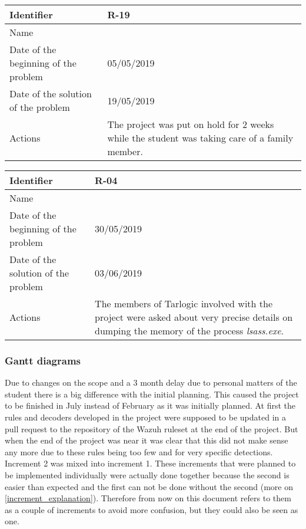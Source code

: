 \begin{table}[H]
	\begin{tabularx}{\textwidth}{|l|X|}
		\hline
		\rowcolor{gray!30}
		Identifier & \textbf{R-19} \\ \hline
		Name & \Rdiecinueve \\ \hline
		Date of the beginning of the problem & 05/05/2019 \\ \hline
		Date of the solution of the problem & 19/05/2019 \\ \hline
		Actions & The project was put on hold for 2 weeks while the student was taking care of a family member. \\ \hline
	\end{tabularx}
\end{table}
\begin{table}[H]
	\begin{tabularx}{\textwidth}{|l|X|}
		\hline
		\rowcolor{gray!30}
		Identifier & \textbf{R-04} \\ \hline
		Name & \Rcuatro \\ \hline
		Date of the beginning of the problem & 30/05/2019 \\ \hline
		Date of the solution of the problem & 03/06/2019 \\ \hline
		Actions & The members of Tarlogic involved with the project were asked about very precise details on dumping the memory of the process \textit{lsass.exe}. \\ \hline
	\end{tabularx}
\end{table}

\subsubsection{Gantt diagrams}
Due to changes on the scope and a 3 month delay due to personal matters of the student there is a big difference with the initial planning.
This caused the project to be finished in July instead of February as it was initially planned.
\linej
At first the rules and decoders developed in the project were supposed to be updated in a pull request to the repository of the Wazuh ruleset at the end of the project.
But when the end of the project was near it was clear that this did not make sense any more due to these rules being too few and for very specific detections.
\linej
\linej
Increment 2 was mixed into increment 1.
These increments that were planned to be implemented individually were actually done together because the second is easier than expected and the first can not be done without the second (more on \ref{increment_explanation}).
Therefore from now on this document refers to them as a couple of increments to avoid more confusion, but they could also be seen as one.

